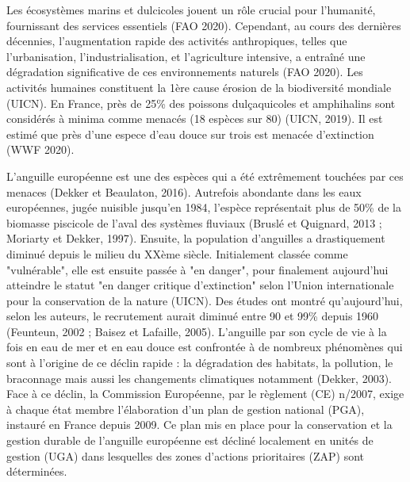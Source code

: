 \documentclass[11pt,titlepage,twoside]{article}\usepackage[]{graphicx}\usepackage[table]{xcolor}
\begin{document}
Les écosystèmes marins et dulcicoles jouent un rôle crucial pour l’humanité, fournissant des services essentiels (FAO 2020).
Cependant, au cours des dernières décennies, l'augmentation rapide des activités anthropiques, telles que l'urbanisation, l'industrialisation, et l'agriculture intensive, a entraîné une dégradation significative de ces environnements naturels (FAO 2020).
Les activités humaines constituent la 1ère cause érosion de la biodiversité mondiale (UICN).
En France, près de 25\% des poissons dulçaquicoles et amphihalins sont considérés à minima comme menacés (18 espèces sur 80) (UICN, 2019).
Il est estimé que près d’une espece d’eau douce sur trois est menacée d’extinction (WWF 2020).

L’anguille européenne est une des espèces qui a été extrêmement touchées par ces menaces (Dekker et Beaulaton, 2016). Autrefois abondante dans les eaux européennes, jugée nuisible jusqu’en 1984, l’espèce représentait plus de 50\% de la biomasse piscicole de l’aval des systèmes fluviaux (Bruslé et Quignard, 2013 ; Moriarty et Dekker, 1997).
Ensuite, la population d'anguilles a drastiquement diminué depuis le milieu du XXème siècle. Initialement classée comme "vulnérable", elle est ensuite passée à "en danger", pour finalement aujourd’hui atteindre le statut "en danger critique d'extinction" selon l'Union internationale pour la conservation de la nature (UICN). Des études ont montré qu’aujourd’hui, selon les auteurs, le recrutement aurait diminué entre 90 et 99\% depuis 1960 (Feunteun, 2002 ; Baisez et Lafaille, 2005).
L’anguille par son cycle de vie à la fois en eau de mer et en eau douce est confrontée à de nombreux phénomènes
qui sont à l’origine de ce déclin rapide : la dégradation des habitats, la pollution, le braconnage mais aussi les
changements climatiques notamment (Dekker, 2003).
Face à ce déclin, la Commission Européenne, par le règlement (CE) n/2007, exige à chaque état membre l'élaboration d'un plan de gestion national (PGA), instauré en France depuis 2009.
Ce plan mis en place pour la conservation et la gestion durable de l'anguille européenne est décliné localement en unités de gestion (UGA) dans lesquelles des zones d'actions prioritaires (ZAP) sont déterminées.
\end{document}
